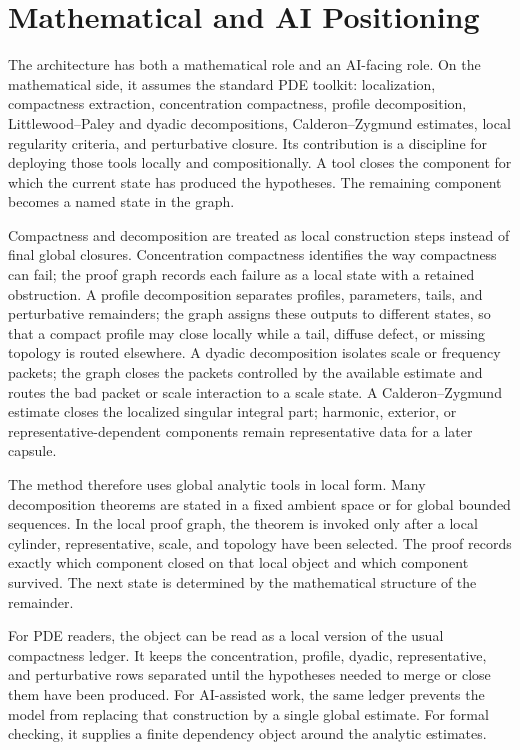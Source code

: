 \documentclass[11pt]{article}
\theoremstyle{plain}
\theoremstyle{definition}
\theoremstyle{remark}
\begin{document}
\section{Mathematical and AI Positioning}
\label{sec:math-positioning}
\label{sec:positioning}

The architecture has both a mathematical role and an AI-facing role.  On the
mathematical side, it assumes the standard PDE toolkit: localization,
compactness extraction, concentration compactness, profile decomposition,
Littlewood--Paley and dyadic decompositions, Calderon--Zygmund estimates,
local regularity criteria, and perturbative closure.  Its contribution is a
discipline for deploying those tools locally and compositionally.  A tool
closes the component for which the current state has produced the hypotheses.
The remaining component becomes a named state in the graph.

Compactness and decomposition are treated as local construction steps instead
of final global closures.  Concentration compactness identifies the way
compactness can fail; the proof graph records each failure as a local state
with a retained obstruction.  A profile decomposition separates profiles,
parameters, tails, and perturbative remainders; the graph assigns these outputs
to different states, so that a compact profile may close locally while a tail,
diffuse defect, or missing topology is routed elsewhere.  A dyadic
decomposition isolates scale or frequency packets; the graph closes the packets
controlled by the available estimate and routes the bad packet or scale
interaction to a scale state.  A Calderon--Zygmund estimate closes the
localized singular integral part; harmonic, exterior, or
representative-dependent components remain representative data for a later capsule.

The method therefore uses global analytic tools in local form.  Many
decomposition theorems are stated in a fixed ambient space or for global
bounded sequences.  In the local proof graph, the theorem is invoked only after
a local cylinder, representative, scale, and topology have been selected.  The
proof records exactly which component closed on that local object and which
component survived.  The next state is determined by the mathematical
structure of the remainder.

For PDE readers, the object can be read as a local version of the usual
compactness ledger.  It keeps the concentration, profile, dyadic, representative,
and perturbative rows separated until the hypotheses needed to merge or close
them have been produced.  For AI-assisted work, the same ledger prevents the
model from replacing that construction by a single global estimate.  For
formal checking, it supplies a finite dependency object around the analytic
estimates.
\end{document}
